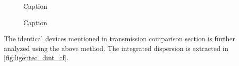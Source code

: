 \begin{figure}
	\centering
	
	\caption{Caption}
	\label{fig:dint_cf}
\end{figure}

\begin{figure}
	\centering
	
	\caption{Caption}
	\label{fig:ligentec_dint_cf}
\end{figure}


The identical devices mentioned in transmission comparison section is further analyzed using the above method. The integrated dispersion is extracted in \autoref{fig:ligentec_dint_cf}.



